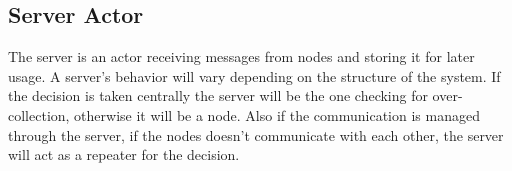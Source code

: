 













\subsection{Server Actor}

The server is an actor receiving messages from nodes and storing it for later usage. A server's behavior will vary depending on the structure of the system. If the decision is taken centrally the server will be the one checking for over-collection, otherwise it will be a node. Also if the communication is managed through the server, if the nodes doesn't communicate with each other, the server will act as a repeater for the decision. 

